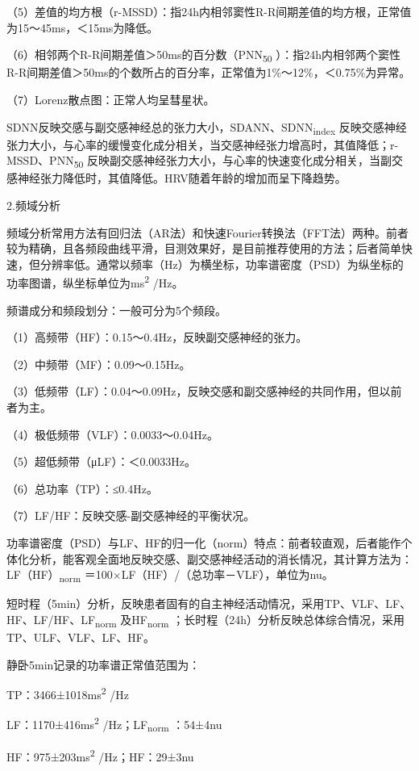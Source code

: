 （5）差值的均方根（r-MSSD）：指24h内相邻窦性R-R间期差值的均方根，正常值为15～45ms，＜15ms为降低。

（6）相邻两个R-R间期差值＞50ms的百分数（PNN\textsubscript{50}
）：指24h内相邻两个窦性R-R间期差值＞50ms的个数所占的百分率，正常值为1\%～12\%，＜0.75\%为异常。

（7）Lorenz散点图：正常人均呈彗星状。

SDNN反映交感与副交感神经总的张力大小，SDANN、SDNN\textsubscript{index}
反映交感神经张力大小，与心率的缓慢变化成分相关，当交感神经张力增高时，其值降低；r-MSSD、PNN\textsubscript{50}
反映副交感神经张力大小，与心率的快速变化成分相关，当副交感神经张力降低时，其值降低。HRV随着年龄的增加而呈下降趋势。

2.频域分析

频域分析常用方法有回归法（AR法）和快速Fourier转换法（FFT法）两种。前者较为精确，且各频段曲线平滑，目测效果好，是目前推荐使用的方法；后者简单快速，但分辨率低。通常以频率（Hz）为横坐标，功率谱密度（PSD）为纵坐标的功率图谱，纵坐标单位为ms\textsuperscript{2}
/Hz。

频谱成分和频段划分：一般可分为5个频段。

（1）高频带（HF）：0.15～0.4Hz，反映副交感神经的张力。

（2）中频带（MF）：0.09～0.15Hz。

（3）低频带（LF）：0.04～0.09Hz，反映交感和副交感神经的共同作用，但以前者为主。

（4）极低频带（VLF）：0.0033～0.04Hz。

（5）超低频带（μLF）：＜0.0033Hz。

（6）总功率（TP）：≤0.4Hz。

（7）LF/HF：反映交感-副交感神经的平衡状况。

功率谱密度（PSD）与LF、HF的归一化（norm）特点：前者较直观，后者能作个体化分析，能客观全面地反映交感、副交感神经活动的消长情况，其计算方法为：LF（HF）\textsubscript{norm}
＝100×LF（HF）/（总功率－VLF），单位为nu。

短时程（5min）分析，反映患者固有的自主神经活动情况，采用TP、VLF、LF、HF、LF/HF、LF\textsubscript{norm}
及HF\textsubscript{norm}
；长时程（24h）分析反映总体综合情况，采用TP、ULF、VLF、LF、HF。

静卧5min记录的功率谱正常值范围为：

TP：3466±1018ms\textsuperscript{2} /Hz

LF：1170±416ms\textsuperscript{2} /Hz；LF\textsubscript{norm} ：54±4nu

HF：975±203ms\textsuperscript{2} /Hz；HF：29±3nu

